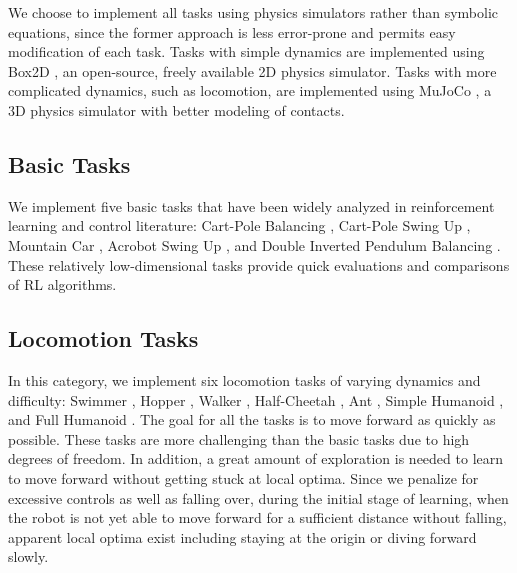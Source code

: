 \documentclass{article}
\begin{document}
We choose to implement all tasks using physics simulators rather than symbolic equations, since the former approach is less error-prone and permits easy modification of each task. Tasks with simple dynamics are implemented using Box2D \cite{Box2D}, an open-source, freely available 2D physics simulator. Tasks with more complicated dynamics, such as locomotion, are implemented using MuJoCo \cite{MuJoCo}, a 3D physics simulator with better modeling of contacts.




\subsection{Basic Tasks}
\label{sec:basic_tasks}








We implement five basic tasks that have been widely analyzed in reinforcement learning and control literature: Cart-Pole Balancing \cite{stephenson1908xx, donaldson1960error, widrow1964pattern, boxes}, Cart-Pole Swing Up \cite{815604, doya2000reinforcement}, Mountain Car \cite{Moore90MountainCar}, Acrobot Swing Up \cite{dejong1994swinging,Murray:M91/46,doya2000reinforcement}, and Double Inverted Pendulum Balancing \cite{Furuta78}. These relatively low-dimensional tasks provide quick evaluations and comparisons of RL algorithms.


















\subsection{Locomotion Tasks}
\label{sec:locomotion_tasks}

In this category, we implement six locomotion tasks of varying dynamics and difficulty: Swimmer \cite{PurcellSwimmer, coulom2002reinforcement, levine2013guided, Schulman15TRPO}, Hopper \cite{murthy19843d, erez2011infinite, levine2013guided, Schulman15TRPO}, Walker \cite{raibert1991animation, erez2011infinite, levine2013guided, Schulman15TRPO}, Half-Cheetah \cite{wawrzynski2007learning, Heess15}, Ant \cite{Schulman15GAE}, Simple Humanoid \cite{tassa2012synthesis, Schulman15GAE}, and Full Humanoid \cite{tassa2012synthesis}.
The goal for all the tasks is to move forward as quickly as possible. These tasks are more challenging than the basic tasks due to high degrees of freedom. In addition, a great amount of exploration is needed to learn to move forward without getting stuck at local optima. Since we penalize for excessive controls as well as falling over, during the initial stage of learning, when the robot is not yet able to move forward for a sufficient distance without falling, apparent local optima exist including staying at the origin or diving forward slowly.
\end{document}
